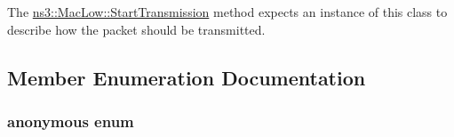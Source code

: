 The \hyperlink{classns3_1_1MacLow_a3d13643c758e213041f8389c1041074b}{ns3\+::\+Mac\+Low\+::\+Start\+Transmission} method expects an instance of this class to describe how the packet should be transmitted. 

\subsection{Member Enumeration Documentation}
\subsubsection[{\texorpdfstring{anonymous enum}{anonymous enum}}]{\setlength{\rightskip}{0pt plus 5cm}anonymous enum\hspace{0.3cm}{\ttfamily [private]}}\hypertarget{classns3_1_1MacLowTransmissionParameters_ac3d96f89467a65f56aa791f522c4ffe6}{}\label{classns3_1_1MacLowTransmissionParameters_ac3d96f89467a65f56aa791f522c4ffe6}
